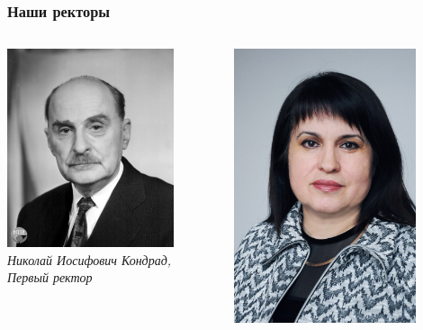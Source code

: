 \documentclass{beamer}
\begin{document}
\begin{frame}
\frametitle{Наши ректоры}

\begin{columns}
  \begin{column}{0.45\textwidth}
    \centering
    \includegraphics[width=0.8\textwidth]{Konrad_Nikolai.jpg}
    \textit{Николай Иосифович Кондрад, Первый ректор}
  \end{column}
  \begin{column}{0.45\textwidth}
    \centering
    \includegraphics[width=0.8\textwidth]{Zomiteva.jpg}

\end{column}
\end{columns}
\end{frame}
\end{document}
